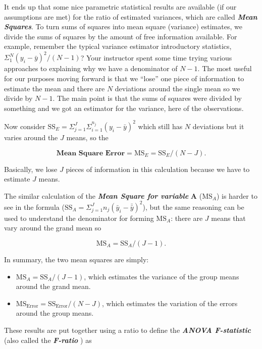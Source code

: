 \documentclass[]{book}
\theoremstyle{definition}
\theoremstyle{definition}
\theoremstyle{remark}
\begin{document}
It ends up that some nice parametric statistical results are available
(if our assumptions are met) for the ratio of estimated variances, which
are called \textbf{\emph{Mean Squares}}. To turn sums of squares into
mean square (variance) estimates, we divide the sums of squares by the
amount of free information available. For example, remember the typical
variance estimator introductory statistics,
\(\Sigma^N_1(y_i-\bar{y})^2/(N-1)\)? Your instructor spent some time
trying various approaches to explaining why we have a denominator of
\(N-1\). The most useful for our purposes moving forward is that we
``lose'' one piece of information to estimate the mean and there are
\(N\) deviations around the single mean so we divide by \(N-1\). The
main point is that the sums of squares were divided by something and we
got an estimator for the variance, here of the observations.

Now consider
\(\text{SS}_E = \Sigma^J_{j=1}\Sigma^{n_j}_{i=1}(y_i-\bar{y})^2\) which
still has \(N\) deviations but it varies around the \(J\) means, so the

\[\textbf{Mean Square Error} = \text{MS}_E = \text{SS}_E/(N-J).\]

Basically, we lose \(J\) pieces of information in this calculation
because we have to estimate \(J\) means.

The similar calculation of the \textbf{\emph{Mean Square for variable}}
\(\mathbf{A}\) (\(\text{MS}_A\)) is harder to see in the formula
(\(\text{SS}_A = \Sigma^J_{j=1}n_j(\bar{y}_i-\bar{\bar{y}})^2\)), but
the same reasoning can be used to understand the denominator for forming
\(\text{MS}_A\): there are \(J\) means that vary around the grand mean
so

\[\text{MS}_A = \text{SS}_A/(J-1).\]

In summary, the two mean squares are simply:

\begin{itemize}
\item
  \(\text{MS}_A = \text{SS}_A/(J-1)\), which estimates the variance of
  the group means around the grand mean.
\item
  \(\text{MS}_{\text{Error}} = \text{SS}_{\text{Error}}/(N-J)\), which
  estimates the variation of the errors around the group means.
\end{itemize}

These results are put together using a ratio to define the
\textbf{\emph{ANOVA F-statistic}} (also called the
\textbf{\emph{F-ratio}} ) as
\end{document}
